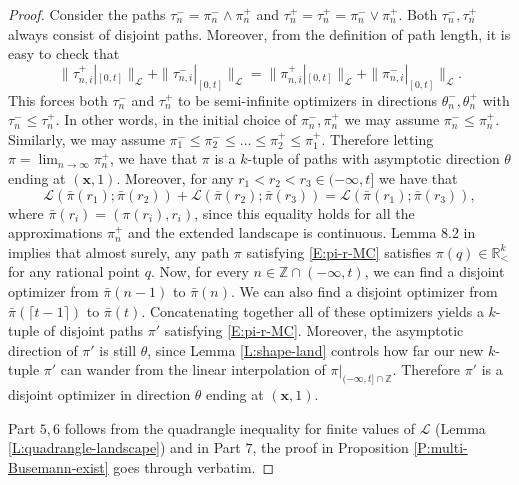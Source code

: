 \documentclass[11pt]{article}
\newcommand{\Z}{\mathbb{Z}}
\newcommand{\R}{\mathbb{R}}
\newcommand{\cL}{\mathcal{L}}
\newcommand{\bx}{\mathbf{x}}
\theoremstyle{definition} %
\theoremstyle{remark} %
\begin{document}
\begin{proof}
 Consider the paths $\tau_n^- = \pi_n^- \wedge \pi_n^+$ and $\tau_n^+ = \tau_n^+ = \pi_n^- \vee \pi_n^+$. Both $\tau_n^-, \tau_n^+$ always consist of disjoint paths. Moreover, from the definition of path length, it is easy to check that 
 $$
 \|\tau_{n, i}^+|_{[0, t]}\|_\cL + \|\tau_{n, i}^-|_{[0, t]}\|_\cL =  \|\pi_{n, i}^+|_{[0, t]}\|_\cL + \|\pi_{n, i}^-|_{[0, t]}\|_\cL .
 $$
 This forces both $\tau_n^-$ and $\tau_n^+$ to be semi-infinite optimizers in directions $\theta_n^-, \theta_n^+$ with $\tau_n^- \le \tau_n^+$. In other words, in the initial choice of $\pi_n^-, \pi_n^+$ we may assume $\pi_n^- \le \pi_n^+$. Similarly, we may assume $\pi_1^- \le \pi_2^- \le \dots \le \pi_2^+ \le \pi_1^+$. Therefore letting $\pi = \lim_{n \to \infty} \pi_n^+$, we have that $\pi$ is a $k$-tuple of paths with asymptotic direction $\theta$ ending at $(\bx, 1)$. Moreover, for any $r_1 < r_2 < r_3 \in (-\infty, t]$ we have that
 \begin{equation}
 	\label{E:pi-r-MC}
 \cL(\bar \pi(r_1) ; \bar \pi(r_2)) +  \cL(\bar \pi(r_2) ; \bar \pi(r_3)) =  \cL(\bar \pi(r_1) ; \bar \pi(r_3)),
\end{equation}
 where $\bar \pi(r_i) = (\pi(r_i), r_i)$, since this equality holds for all the approximations $\pi_n^+$ and the extended landscape is continuous. Lemma 8.2 in \cite{dauvergne2021disjoint} implies that almost surely, any path $\pi$ satisfying \eqref{E:pi-r-MC} satisfies $\pi(q) \in \R^k_<$ for any rational point $q$. Now, for every $n \in \Z \cap (-\infty, t)$, we can find a disjoint optimizer from $\bar \pi(n-1)$ to $\bar \pi(n)$. We can also find a disjoint optimizer from $\bar \pi(\lceil t-1 \rceil)$ to $\bar \pi(t)$.
 Concatenating together all of these optimizers yields a $k$-tuple of disjoint paths $\pi'$ satisfying \eqref{E:pi-r-MC}. Moreover, the asymptotic direction of $\pi'$ is still $\theta$, since Lemma \ref{L:shape-land} controls how far our new $k$-tuple $\pi'$ can wander from the linear interpolation of $\pi|_{(-\infty, t] \cap \Z}$. Therefore $\pi'$ is a disjoint optimizer in direction $\theta$ ending at $(\bx, 1)$.
 
 Part $5, 6$ follows from the quadrangle inequality for finite values of $\cL$ (Lemma \ref{L:quadrangle-landscape}) and in Part $7$, the proof in Proposition \ref{P:multi-Busemann-exist} goes through verbatim. 
\end{proof}
\end{document}
